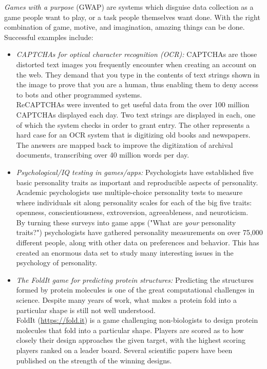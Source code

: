 \documentclass[10pt]{article}
\begin{document}
\textit{Games with a purpose} (GWAP) are systems which disguise data collection as a game people want to play, or a task people themselves want done. With the right combination of game, motive, and imagination, amazing things can be done. Successful examples include:

\begin{itemize}
    \item \textit{CAPTCHAs for optical character recognition (OCR):} CAPTCHAs are those distorted text images you frequently encounter when creating an account on the web. They demand that you type in the contents of text strings shown in the image to prove that you are a human, thus enabling them to deny access to bots and other programmed systems.\\
          ReCAPTCHAs were invented to get useful data from the over 100 million CAPTCHAs displayed each day. Two text strings are displayed in each, one of which the system checks in order to grant entry. The other represents a hard case for an OCR system that is digitizing old books and newspapers. The answers are mapped back to improve the digitization of archival documents, transcribing over 40 million words per day.
    \item \textit{Psychological/IQ testing in games/apps:} Psychologists have established five basic personality traits as important and reproducible aspects of personality. Academic psychologists use multiple-choice personality tests to measure where individuals sit along personality scales for each of the big five traits: openness, conscientiousness, extroversion, agreeableness, and neuroticism.\\
          By turning these surveys into game apps ("What are \textit{your} personality traits?") psychologists have gathered personality measurements on over 75,000 different people, along with other data on preferences and behavior. This has created an enormous data set to study many interesting issues in the psychology of personality.
    \item \textit{The FoldIt game for predicting protein structures:} Predicting the structures formed by protein molecules is one of the great computational challenges in science. Despite many years of work, what makes a protein fold into a particular shape is still not well understood.\\
          FoldIt (\url{https://fold.it}) is a game challenging non-biologists to design protein molecules that fold into a particular shape. Players are scored as to how closely their design approaches the given target, with the highest scoring players ranked on a leader board. Several scientific papers have been published on the strength of the winning designs.
\end{itemize}
\end{document}
